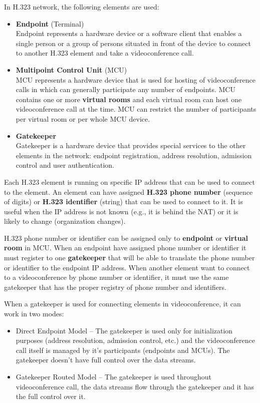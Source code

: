 \documentclass[a4paper]{report}
\begin{document}
In H.323 network, the following elements are used:

\begin{itemize}

\item \textbf{Endpoint} (Terminal) \\
Endpoint represents a hardware device or a software client that enables a single person or a group of persons situated in front of the device to connect to another H.323 element and take a videoconference call.

\item \textbf{Multipoint Control Unit} (MCU) \\
MCU represents a hardware device that is used for hosting of videoconference calls in which can generally participate any number of endpoints. MCU contains one or more \textbf{virtual rooms} and each virtual room can host one videoconference call at the time. MCU can restrict the number of participants per virtual room or per whole MCU device.

\item \textbf{Gatekeeper} \\
Gatekeeper is a hardware device that provides special services to the other elements in the network: endpoint registration, address resolution, admission control and user authentication.

\end{itemize}

Each H.323 element is running on specific IP address that can be used to connect to the element. An element can have assigned \textbf{H.323 phone number} (sequence of digits) or \textbf{ H.323 identifier} (string) that can be used to connect to it. It is useful when the IP address is not known (e.g., it is behind the NAT) or it is likely to change (organization changes).

H.323 phone number or identifier can be assigned only to \textbf{endpoint} or \textbf{virtual room} in MCU. When an endpoint have assigned phone number or identifier it must register to one \textbf{gatekeeper} that will be able to translate the phone number or identifier to the endpoint IP address. When another element want to connect to a videoconference by phone number or identifier, it must use the same gatekeeper that has the proper registry of phone number and identifiers.

When a gatekeeper is used for connecting elements in videoconference, it can work in two modes:
\begin{itemize}
\item Direct Endpoint Model -- The gatekeeper is used only for initialization purposes (address resolution, admission control, etc.) and the videoconference call itself is managed by it's participants (endpoints and MCUs). The gatekeeper doesn't have full control over the data streams.
\item Gatekeeper Routed Model -- The gatekeeper is used throughout videoconference call, the data streams flow through the gatekeeper and it has the full control over it.
\end{itemize}
\end{document}
